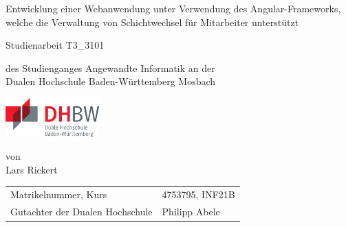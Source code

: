\def\doctype{Dokumententyp}
\def\title{Entwicklung einer Webanwendung unter Verwendung des Angular-Frameworks, welche die Verwaltung von Schichtwechsel für Mitarbeiter unterstützt}
\def\author{Lars Rickert}

\begin{titlepage}

	\vspace{10mm}

	\begin{center}
		\vspace{5mm}

		\huge \title

		\vspace{14.2pt}



		\vspace{42.6pt}

		\large Studienarbeit T3\_3101

		\vspace{42.6pt}

		\small des Studienganges Angewandte Informatik an der \\
		\large Dualen Hochschule Baden-Württemberg Mosbach

		\vspace{14.2pt}

		\includegraphics[height=1.5cm]{prefix/image/logo-dhbw.pdf}

		\vspace{42.6pt}

		\small von \\
		\large \author
	\end{center}

	\vspace{140pt}

	\begin{table}[h]
		\centering
		\begin{tabular}{ll}
			\small Matrikelnummer, Kurs            & 4753795, INF21B \\
			\small Gutachter der Dualen Hochschule & Philipp Abele   \\
		\end{tabular}
	\end{table}

	\vspace{49.7pt}


\end{titlepage}